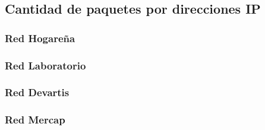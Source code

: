\subsection{Cantidad de paquetes por direcciones IP}


\subsubsection{Red Hogareña}
\subsubsection{Red Laboratorio}
\subsubsection{Red Devartis}
\subsubsection{Red Mercap}
